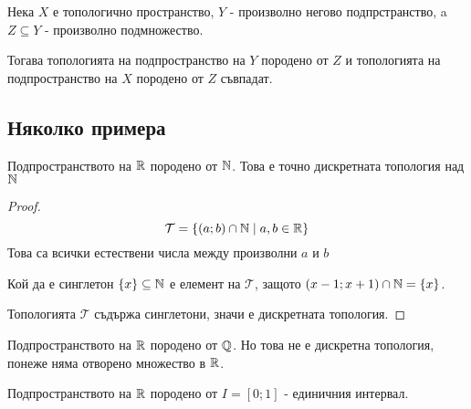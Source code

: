 \begin{proposition}
    Нека $X$ е топологично пространство, $Y$ - произволно негово подпрстранство, a $Z \subseteq Y$ - произволно подмножество.

    Тогава топологията на подпространство на $Y$ породено от $Z$ и топологията на подпространство на $X$ породено от $Z$ съвпадат.
\end{proposition}

\subsection{Няколко примера}
\begin{example}
    Подпространството на ${\mathbb{R}}$ породено от ${\mathbb{N}}$. Това е точно дискретната топология над ${\mathbb{N}}$
\end{example}
\begin{proof}
    \begin{equation}
        \mathcal T = \left\{(a; b) \cap {\mathbb{N}} \mid a, b \in {\mathbb{R}}\right\}
    \end{equation}
    Това са всички естествени числа между произволни $a$ и $b$

    Кой да е синглетон $\{x\} \subseteq {\mathbb{N}}$ е елемент на $\mathcal T$, защото $(x-1;x+1) \cap {\mathbb{N}} = \{x\}$.

    Топологията $\mathcal T$ съдържа синглетони, значи е дискретната топология.
\end{proof}
\begin{example}
    Подпространството на ${\mathbb{R}}$ породено от ${\mathbb{Q}}$. Но това не е дискретна топология, понеже няма отворено множество в ${\mathbb{R}}$. 
\end{example}
\begin{example}
    Подпространството на ${\mathbb{R}}$ породено от $I = [0; 1]$ - единичния интервал.
\end{example}
